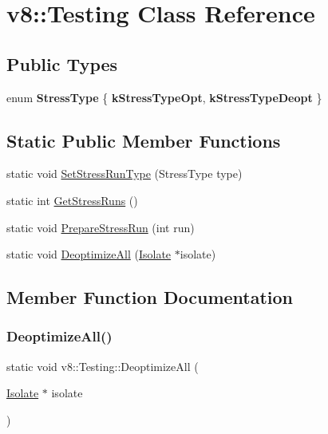 \hypertarget{classv8_1_1Testing}{}\section{v8\+:\+:Testing Class Reference}
\label{classv8_1_1Testing}
\subsection*{Public Types}
\begin{DoxyCompactItemize}
\item 
\mbox{\label{classv8_1_1Testing_a436a1a521a0bc070cc0b46ad7a658575}} 
enum {\bfseries Stress\+Type} \{ {\bfseries k\+Stress\+Type\+Opt}, 
{\bfseries k\+Stress\+Type\+Deopt}
 \}
\end{DoxyCompactItemize}
\subsection*{Static Public Member Functions}
\begin{DoxyCompactItemize}
\item 
static void \mbox{\hyperlink{classv8_1_1Testing_aafa5a4917998aa64134aa750ce5c4b2e}{Set\+Stress\+Run\+Type}} (Stress\+Type type)
\item 
static int \mbox{\hyperlink{classv8_1_1Testing_adc876063b1e07462b8d9544dd8efab36}{Get\+Stress\+Runs}} ()
\item 
static void \mbox{\hyperlink{classv8_1_1Testing_ab9da044b18b9d05770b655bed27ed7f4}{Prepare\+Stress\+Run}} (int run)
\item 
static void \mbox{\hyperlink{classv8_1_1Testing_ac0881a3cee2f8f91039d3ecdb15dbf27}{Deoptimize\+All}} (\mbox{\hyperlink{classv8_1_1Isolate}{Isolate}} $\ast$isolate)
\end{DoxyCompactItemize}


\subsection{Member Function Documentation}
\mbox{\label{classv8_1_1Testing_ac0881a3cee2f8f91039d3ecdb15dbf27}} 
\subsubsection{\texorpdfstring{Deoptimize\+All()}{DeoptimizeAll()}}
{\footnotesize\ttfamily static void v8\+::\+Testing\+::\+Deoptimize\+All (\begin{DoxyParamCaption}\item[{\mbox{\hyperlink{classv8_1_1Isolate}{Isolate}} $\ast$}]{isolate }\end{DoxyParamCaption})\hspace{0.3cm}{\ttfamily [static]}}

